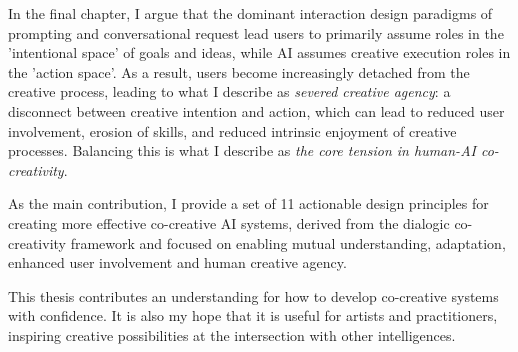In the final chapter, I argue that the dominant interaction design paradigms of prompting and conversational request lead users to primarily assume roles in the 'intentional space' of goals and ideas, while AI assumes creative execution roles in the 'action space'. As a result, users become increasingly detached from the creative process, leading to what I describe as \textit{severed creative agency}: a disconnect between creative intention and action, which can lead to reduced user involvement, erosion of skills, and reduced intrinsic enjoyment of creative processes. Balancing this is what I describe as \textit{the core tension in human-AI co-creativity}.

As the main contribution, I provide a set of 11 actionable design principles for creating more effective co-creative AI systems, derived from the dialogic co-creativity framework and focused on enabling mutual understanding, adaptation, enhanced user involvement and human creative agency. 

This thesis contributes an understanding for how to develop co-creative systems with confidence. It is also my hope that it is useful for artists and practitioners, inspiring creative possibilities at the intersection with other intelligences.
